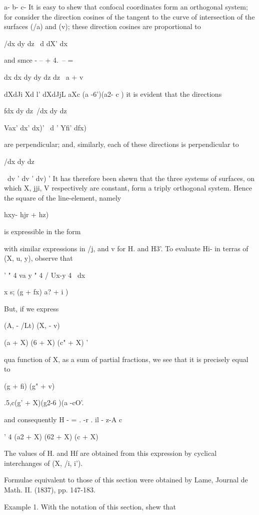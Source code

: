 {{a- b- c- It is easy to shew that confocal coordinates form an
orthogonal system; for consider the direction cosines of the tangent
to the curve of intersection of the surfaces (/a) and (v); these
direction cosines are proportional to

/dx dy dz \ d dX' dx

and smce - -- + 4.\ -- = %

dx dx dy dy dz dz \ a + v

dXdJi Xd l' dXdJjL aXc (a -6')(a2- c ) it is evident that the
directions

fdx dy dz\ /dx dy dz\

Vax' dx' dx)' \ d ' Yfi' dfx)

are perpendicular; and, similarly, each of these directions is
perpendicular to

/dx dy dz\

\ dv ' dv ' dv) ' It has therefore been shewn that the three systems
of surfaces, on which X, jji, V respectively are constant, form a
triply orthogonal system. Hence the square of the line-element, namely

 hxy- hjr + hz)\

is expressible in the form

%
%

with similar expressions in /j, and v for H. and H3'. To evaluate Hi-
in terras of (X, u, y), observe that

' " 4 va y " 4 / Ux-y 4 \ dx

 x s; (g + fx) a? + i )

But, if we express

(A, - /Lt) (X, - v)

(a + X) (6 + X) (c" + X) '

qua function of X, as a sum of partial fractions, we see that it is
precisely equal to

  (g + fi) (g" + v)

 .5,c(g' + X)(g2-6 )(a -cO'.

and consequently H - = . -r . il - z-A c 

  ' 4 (a2 + X) (62 + X) (c + X)

The values of H. and Hf are obtained from this expression by cyclical
interchanges of (X, /i, i').

Formulae equivalent to those of this section were obtained by Lame,
Journal de Math. II. (1837), pp. 147-183.

Example 1. With the notation of this section, shew that

}}

